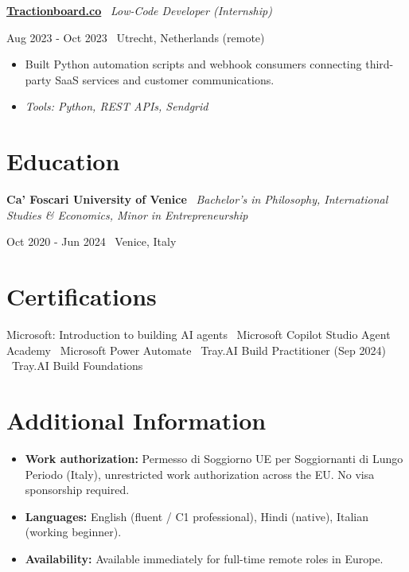 \documentclass[a4paper,10pt]{article}
\newcommand{\role}[4]{%
  \vspace{2pt}\noindent
  \begin{minipage}[t]{0.70\textwidth}\raggedright\textbf{#1} \textbullet\ \textit{#3}\end{minipage}%
  \hfill
  \begin{minipage}[t]{0.28\textwidth}\raggedleft\footnotesize\color{gray}#2 \textbullet\ #4\end{minipage}%
  \vspace{1pt}%
}
\begin{document}
\role{\href{https://tractionboard.co}{Tractionboard.co}}{Aug 2023 - Oct 2023}{Low-Code Developer (Internship)}{Utrecht, Netherlands (remote)}
\begin{itemize}
  \item Built Python automation scripts and webhook consumers connecting third-party SaaS services and customer communications.
  \item \textit{Tools: Python, REST APIs, Sendgrid}
\end{itemize}

\section{Education}
\role{Ca' Foscari University of Venice}{Oct 2020 - Jun 2024}{Bachelor's in Philosophy, International Studies \& Economics, Minor in Entrepreneurship}{Venice, Italy}

\section{Certifications}
Microsoft: Introduction to building AI agents \textbullet\ Microsoft Copilot Studio Agent Academy \textbullet\ Microsoft Power Automate \textbullet\ Tray.AI Build Practitioner (Sep 2024) \textbullet\ Tray.AI Build Foundations

\section{Additional Information}
\begin{itemize}
  \item \textbf{Work authorization:} Permesso di Soggiorno UE per Soggiornanti di Lungo Periodo (Italy), unrestricted work authorization across the EU. No visa sponsorship required.
  \item \textbf{Languages:} English (fluent / C1 professional), Hindi (native), Italian (working beginner).
  \item \textbf{Availability:} Available immediately for full-time remote roles in Europe.
\end{itemize}

\end{document}
